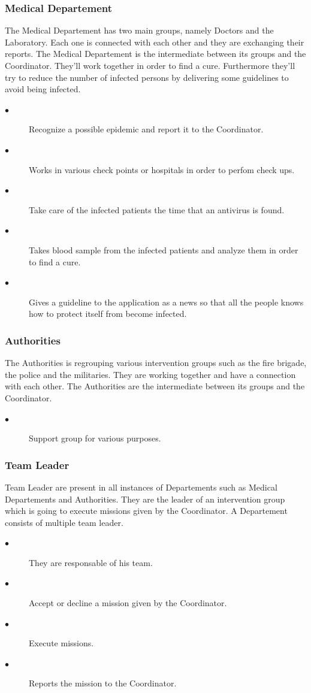 \subsubsection{Medical Departement}
The Medical Departement has two main groups, namely Doctors and the Laboratory.
Each one is connected with each other and they are exchanging their reports. The
Medical Departement is the intermediate between its groups and the Coordinator.
They'll work together in order to find a cure. Furthermore they'll try to reduce
the number of infected persons by delivering some guidelines to avoid being
infected.
\begin{description}
 \item[$\bullet$] Recognize a possible epidemic and report it to the
 Coordinator.
 \item[$\bullet$] Works in various check points or hospitals in order to perfom
 check ups.
 \item[$\bullet$] Take care of the infected patients the time that an antivirus
 is found.
 \item[$\bullet$] Takes blood sample from the infected patients and analyze
 them in order to find a cure.
 \item[$\bullet$] Gives a guideline to the application as a news so that all the
 people knows how to protect itself from become infected.
\end{description} 

\subsubsection{Authorities}
The Authorities is regrouping various intervention groups such as the fire
brigade, the police and the militaries. They are working together and have a
connection with each other. The Authorities are the intermediate between its
groups and the Coordinator.
\begin{description}
 \item[$\bullet$] Support group for various purposes. 
\end{description}

\subsubsection{Team Leader}
Team Leader are present in all instances of Departements such as Medical
Departements and Authorities. They are the leader of an intervention group which
is going to execute missions given by the Coordinator. A Departement consists of
multiple team leader.
\begin{description}
 \item[$\bullet$] They are responsable of his team.
 \item[$\bullet$] Accept or decline a mission given by the Coordinator.
 \item[$\bullet$] Execute missions.
 \item[$\bullet$] Reports the mission to the Coordinator.
\end{description}

